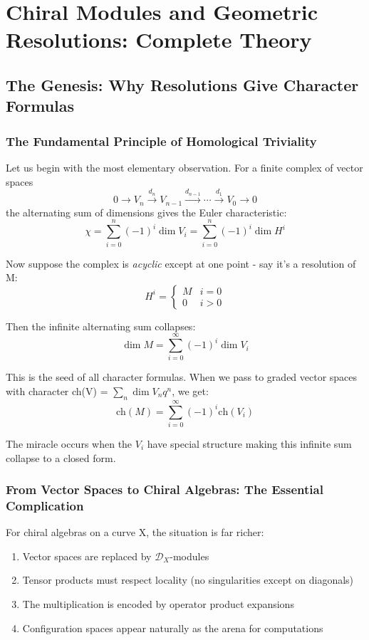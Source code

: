\chapter{Chiral Modules and Geometric Resolutions: Complete Theory}

\section{The Genesis: Why Resolutions Give Character Formulas}

\subsection{The Fundamental Principle of Homological Triviality}

Let us begin with the most elementary observation. For a finite complex of vector spaces
\[
0 \to V_n \xrightarrow{d_n} V_{n-1} \xrightarrow{d_{n-1}} \cdots \xrightarrow{d_1} V_0 \to 0
\]
the alternating sum of dimensions gives the Euler characteristic:
\[
\chi = \sum_{i=0}^n (-1)^i \dim V_i = \sum_{i=0}^n (-1)^i \dim H^i
\]

Now suppose the complex is \emph{acyclic} except at one point - say it's a resolution of M:
\[
H^i = \begin{cases} M & i = 0 \\ 0 & i > 0 \end{cases}
\]

Then the infinite alternating sum collapses:
\[
\dim M = \sum_{i=0}^\infty (-1)^i \dim V_i
\]

This is the seed of all character formulas. When we pass to graded vector spaces with character ch(V) = $\sum_{n} \dim V_n q^n$, we get:
\[
\text{ch}(M) = \sum_{i=0}^\infty (-1)^i \text{ch}(V_i)
\]

The miracle occurs when the $V_i$ have special structure making this infinite sum collapse to a closed form.

\subsection{From Vector Spaces to Chiral Algebras: The Essential Complication}

For chiral algebras on a curve X, the situation is far richer:
\begin{enumerate}
\item Vector spaces are replaced by $\mathcal{D}_X$-modules
\item Tensor products must respect locality (no singularities except on diagonals)  
\item The multiplication is encoded by operator product expansions
\item Configuration spaces appear naturally as the arena for computations
\end{enumerate}

